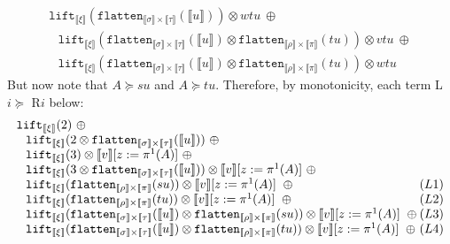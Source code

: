 \documentclass[a4paper,UKenglish,cleveref,autoref,numberwithinsect]{lipics-v2019}
\theoremstyle{definition}
\newcommand{\flatten}{\mathtt{flatten}}
\newcommand{\lift}{\mathtt{lift}}
\newcommand{\typeinterpret}[1]{\llbracket #1 \rrbracket}
\newcommand{\interpret}[1]{\llbracket #1 \rrbracket}
\begin{document}
\begin{itemize}
\[\begin{array}{l}
    \lift_{\typeinterpret{\xi}}(\flatten_{\typeinterpret{\sigma}
    \times \typeinterpret{\tau}}(\interpret{u})) \otimes wtu\ \oplus \\
  \phantom{A}
    \lift_{\typeinterpret{\xi}}(\flatten_{\typeinterpret{\sigma}
    \times \typeinterpret{\tau}}(\interpret{u}) \otimes
    \flatten_{\typeinterpret{\rho} \times
    \typeinterpret{\pi}}(tu)) \otimes vtu\ \oplus \\
  \phantom{A}
    \lift_{\typeinterpret{\xi}}(\flatten_{\typeinterpret{\sigma}
    \times \typeinterpret{\tau}}(\interpret{u}) \otimes
    \flatten_{\typeinterpret{\rho}
    \times \typeinterpret{\pi}}(tu)) \otimes wtu
  \end{array}
  \]
  But now note that $A \succeq su$ and $A \succeq tu$.  Therefore, by
  monotonicity, each term L$i \succeq$ R$i$ below:
  \[
  \begin{array}{l}
  \lift_{\typeinterpret{\xi}}(2)\ \oplus \\
  \phantom{A}
     \lift_{\typeinterpret{\xi}}(2 \otimes
      \flatten_{\typeinterpret{\sigma} \times \typeinterpret{\tau}}(
      \interpret{u}))\ \oplus \\
  \phantom{A}
    \lift_{\typeinterpret{\xi}}(3) \otimes \interpret{v}[z:=\pi^1(A)]
    \ \oplus \\
  \phantom{A}
    \lift_{\typeinterpret{\xi}}(3 \otimes
    \flatten_{\typeinterpret{\sigma} \times \typeinterpret{\tau}}(
    \interpret{u})) \otimes
     \interpret{v}[z:=\pi^1(A)]
    \ \oplus \\
  \phantom{A}
    \lift_{\typeinterpret{\xi}}(\flatten_{\typeinterpret{\rho} \times
    \typeinterpret{\pi}}(su)) \otimes
     \interpret{v}[z:=\pi^1(A)]
    \ \oplus \hfill (L1) \\
  \phantom{A}
    \lift_{\typeinterpret{\xi}}(\flatten_{\typeinterpret{\rho} \times
    \typeinterpret{\pi}}(tu)) \otimes
     \interpret{v}[z:=\pi^1(A)]
    \ \oplus \hfill (L2) \\
  \phantom{A}
    \lift_{\typeinterpret{\xi}}(\flatten_{\typeinterpret{\sigma} \times
    \typeinterpret{\tau}}(\interpret{u}) \otimes
    \flatten_{\typeinterpret{\rho} \times \typeinterpret{\pi}}(su))
    \otimes
     \interpret{v}[z:=\pi^1(A)]
    \ \oplus \hfill (L3) \\
  \phantom{A}
    \lift_{\typeinterpret{\xi}}(\flatten_{\typeinterpret{\sigma} \times
    \typeinterpret{\tau}}(\interpret{u}) \otimes
    \flatten_{\typeinterpret{\rho} \times \typeinterpret{\pi}}(tu))
    \otimes
     \interpret{v}[z:=\pi^1(A)]
    \ \oplus \hfill (L4) \\

\end{array}\]
\end{itemize}
\end{document}
